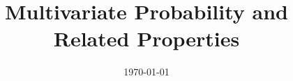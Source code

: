 \documentclass[11pt]{report}
\title{\textbf{Multivariate Probability and Related Properties}} %
\author{\scribe} %
\date{\today} %
\begin{document}
\maketitle	
\tableofcontents
\chapter{}

\chapter{}

\chapter{}

\chapter{}

\end{document}
